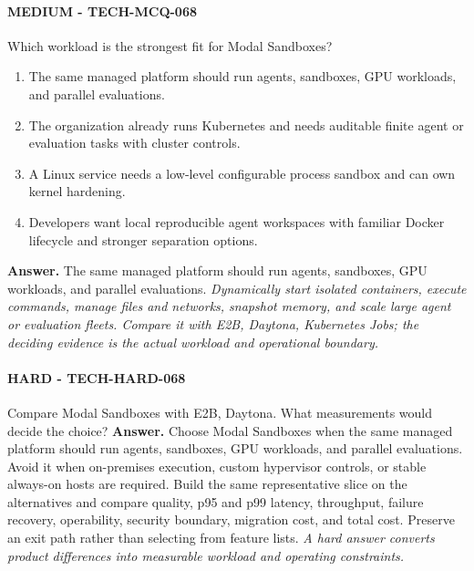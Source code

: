 \paragraph{MEDIUM - TECH-MCQ-068} Which workload is the strongest fit for Modal Sandboxes?
\begin{enumerate}[label=\Alph*.]
\item The same managed platform should run agents, sandboxes, GPU workloads, and parallel evaluations.
\item The organization already runs Kubernetes and needs auditable finite agent or evaluation tasks with cluster controls.
\item A Linux service needs a low-level configurable process sandbox and can own kernel hardening.
\item Developers want local reproducible agent workspaces with familiar Docker lifecycle and stronger separation options.
\end{enumerate}
\textbf{Answer.} The same managed platform should run agents, sandboxes, GPU workloads, and parallel evaluations.
\textit{Dynamically start isolated containers, execute commands, manage files and networks, snapshot memory, and scale large agent or evaluation fleets. Compare it with E2B, Daytona, Kubernetes Jobs; the deciding evidence is the actual workload and operational boundary.}
\paragraph{HARD - TECH-HARD-068} Compare Modal Sandboxes with E2B, Daytona. What measurements would decide the choice?
\textbf{Answer.} Choose Modal Sandboxes when the same managed platform should run agents, sandboxes, GPU workloads, and parallel evaluations. Avoid it when on-premises execution, custom hypervisor controls, or stable always-on hosts are required. Build the same representative slice on the alternatives and compare quality, p95 and p99 latency, throughput, failure recovery, operability, security boundary, migration cost, and total cost. Preserve an exit path rather than selecting from feature lists.
\textit{A hard answer converts product differences into measurable workload and operating constraints.}

